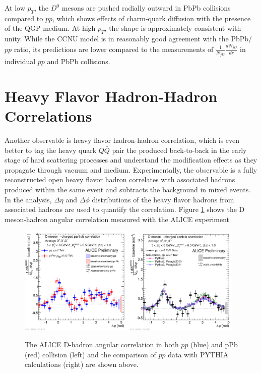 At low $p_T$, the $D^0$ mesons are pushed radially outward in PbPb collisions compared to $pp$, which shows effects of charm-quark diffusion with the presence of the QGP medium. At high $p_T$, the shape is approximately consistent with unity. While the CCNU model is in reasonably good agreement with the PbPb/$pp$ ratio, its predictions are lower compared to the measurements of $\frac{1}{N_{jD}}\frac{dN_{jD}}{dr}$ in individual $pp$ and PbPb collisions.


\section{Heavy Flavor Hadron-Hadron Correlations}

Another observable is heavy flavor hadron-hadron correlation, which is even better to tag the heavy quark $Q\bar Q$ pair the produced back-to-back in the early stage of hard scattering processes and understand the modification effects as they propagate through vacuum and medium. Experimentally, the observable is a fully reconstructed open heavy flavor hadron correlates with associated hadrons produced within the same event and subtracts the background in mixed events. In the analysis, $\Delta \eta$ and $\Delta \phi$ distributions of the heavy flavor hadrons from associated hadrons are used to quantify the correlation. Figure \ref{ALICEDHadron} shows the D meson-hadron angular correlation measured with the ALICE experiment \cite{DHadronRef}


\begin{figure}[hbtp]
\begin{center}
\includegraphics[width=0.48\textwidth]{Figures/Chapter2/ALICEDHadron.png}
\includegraphics[width=0.48\textwidth]{Figures/Chapter2/ALICEDHadronPP.png}
\caption{The ALICE D-hadron angular correlation in both $pp$ (blue) and pPb (red) collision (left) and the comparison of $pp$ data with PYTHIA calculations (right) are shown above.}
\label{ALICEDHadron}
\end{center}
\end{figure}   

